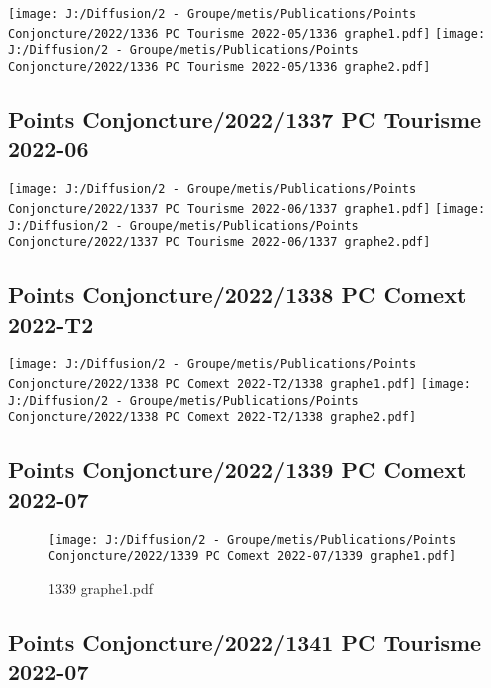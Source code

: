 \documentclass[
]{article}
\begin{document}
\texttt{[image: J:/Diffusion/2 - Groupe/metis/Publications/Points Conjoncture/2022/1336 PC Tourisme 2022-05/1336 graphe1.pdf]}
\texttt{[image: J:/Diffusion/2 - Groupe/metis/Publications/Points Conjoncture/2022/1336 PC Tourisme 2022-05/1336 graphe2.pdf]}

\hypertarget{points-conjoncture20221337-pc-tourisme-2022-06}{%
\subsection{Points Conjoncture/2022/1337 PC Tourisme
2022-06}\label{points-conjoncture20221337-pc-tourisme-2022-06}}

\texttt{[image: J:/Diffusion/2 - Groupe/metis/Publications/Points Conjoncture/2022/1337 PC Tourisme 2022-06/1337 graphe1.pdf]}
\texttt{[image: J:/Diffusion/2 - Groupe/metis/Publications/Points Conjoncture/2022/1337 PC Tourisme 2022-06/1337 graphe2.pdf]}

\hypertarget{points-conjoncture20221338-pc-comext-2022-t2}{%
\subsection{Points Conjoncture/2022/1338 PC Comext
2022-T2}\label{points-conjoncture20221338-pc-comext-2022-t2}}

\texttt{[image: J:/Diffusion/2 - Groupe/metis/Publications/Points Conjoncture/2022/1338 PC Comext 2022-T2/1338 graphe1.pdf]}
\texttt{[image: J:/Diffusion/2 - Groupe/metis/Publications/Points Conjoncture/2022/1338 PC Comext 2022-T2/1338 graphe2.pdf]}

\hypertarget{points-conjoncture20221339-pc-comext-2022-07}{%
\subsection{Points Conjoncture/2022/1339 PC Comext
2022-07}\label{points-conjoncture20221339-pc-comext-2022-07}}

\begin{figure}
\centering
\texttt{[image: J:/Diffusion/2 - Groupe/metis/Publications/Points Conjoncture/2022/1339 PC Comext 2022-07/1339 graphe1.pdf]}
\caption{1339 graphe1.pdf}
\end{figure}

\hypertarget{points-conjoncture20221341-pc-tourisme-2022-07}{%
\subsection{Points Conjoncture/2022/1341 PC Tourisme
2022-07}\label{points-conjoncture20221341-pc-tourisme-2022-07}}
\end{document}
